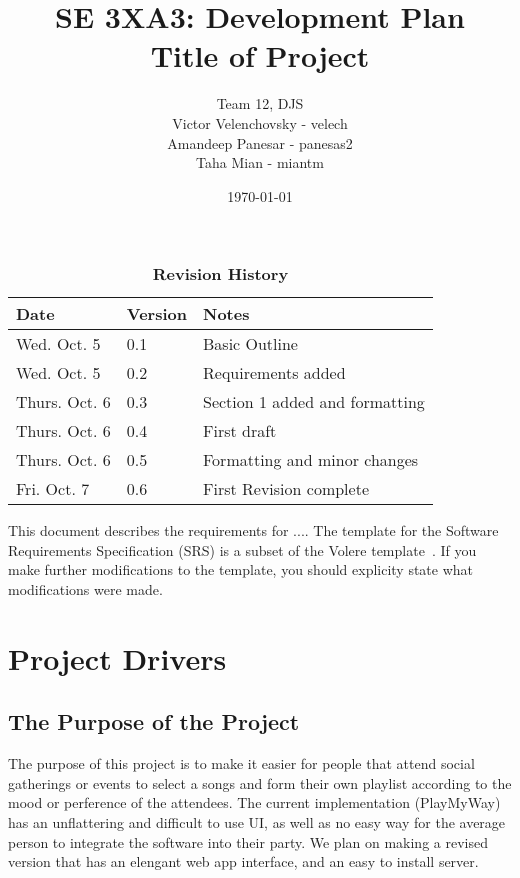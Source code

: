 \documentclass[12pt, titlepage]{article}
\title{SE 3XA3: Development Plan\\Title of Project}
\author{Team 12, DJS
	\\ Victor Velenchovsky - velech
	\\ Amandeep Panesar - panesas2
	\\ Taha Mian - miantm
}
\date{\today}
\begin{document}
\maketitle

\tableofcontents
\listoftables
\listoffigures

\begin{table}[bp]
\caption{\bf Revision History}
\begin{tabularx}{\textwidth}{p{3cm}p{2cm}X}
\toprule {\bf Date} & {\bf Version} & {\bf Notes}\\
\midrule
Wed. Oct. 5 & 0.1 & Basic Outline \\
Wed. Oct. 5 & 0.2 & Requirements added \\
Thurs. Oct. 6 & 0.3 & Section 1 added and formatting \\
Thurs. Oct. 6 & 0.4 & First draft \\
Thurs. Oct. 6 & 0.5 & Formatting and minor changes \\
Fri. Oct. 7 & 0.6 & First Revision complete \\
\bottomrule
\end{tabularx}
\end{table}

\newpage


This document describes the requirements for ....  The template for the Software
Requirements Specification (SRS) is a subset of the Volere
template~\citep{RobertsonAndRobertson2012}.  If you make further modifications
to the template, you should explicity state what modifications were made.

\section{Project Drivers}

\subsection{The Purpose of the Project}
The purpose of this project is to make it easier for people that attend social
gatherings or events to select a songs and form their own playlist according to
the mood or perference of the attendees. The current implementation (PlayMyWay)
has an unflattering and difficult to use UI, as well as no easy way for the
average person to integrate the software into their party. We plan on making a
revised version that has an elengant web app interface, and an easy to install
server.
\end{document}

